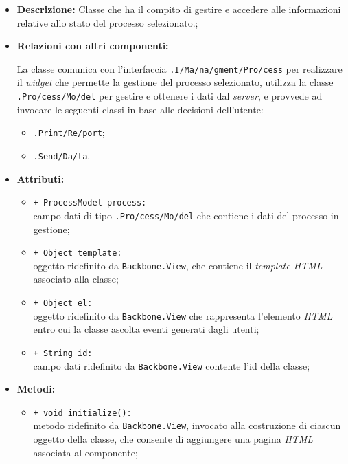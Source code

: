 \begin{flushleft}
\begin{itemize}
\item \textbf{Descrizione:} Classe che ha il compito di gestire e accedere alle informazioni relative allo stato del processo selezionato.;
\item \textbf{Relazioni con altri componenti:}
\begin{sloppypar}
La classe comunica con l'interfaccia \texttt{\viewUser{}.I\fshyp{}Ma\fshyp{}na\fshyp{}gment\fshyp{}Pro\fshyp{}cess} per realizzare il \textit{widget} che permette la gestione del processo selezionato, utilizza la classe \texttt{\model{}.Pro\fshyp{}cess\fshyp{}Mo\fshyp{}del} per gestire e ottenere i dati dal \textit{server}, e provvede ad invocare le seguenti classi in base alle decisioni dell'utente:
\begin{itemize}
\item \texttt{\logicUser{}.Print\fshyp{}Re\fshyp{}port};
\item \texttt{\logicUser{}.Send\fshyp{}Da\fshyp{}ta}.
\end{itemize}
\end{sloppypar}
\item \textbf{Attributi:}
\begin{sloppypar}
\begin{itemize}
\item \texttt{+ ProcessModel process:}\\ campo dati di tipo \texttt{\model{}.Pro\fshyp{}cess\fshyp{}Mo\fshyp{}del} che contiene i dati del processo in gestione;
\item \texttt{+ Object template:}\\ oggetto ridefinito da \texttt{Backbone.View}, che contiene il \textit{template HTML} associato alla classe;
\item \texttt{+ Object el:}\\ oggetto ridefinito da \texttt{Backbone.View} che rappresenta l'elemento \textit{HTML} entro cui la classe ascolta eventi generati dagli utenti;
\item \texttt{+ String id:}\\ campo dati ridefinito da \texttt{Backbone.View} contente l'id della classe;
\end{itemize}
\end{sloppypar}
\item \textbf{Metodi:}
\begin{sloppypar}
\begin{itemize}
\item \texttt{+ void initialize():}\\ metodo ridefinito da \texttt{Backbone.View}, invocato alla costruzione di ciascun oggetto della classe, che consente di aggiungere una pagina \textit{HTML} associata al componente;

\end{itemize}
\end{sloppypar}
\end{itemize}
\end{flushleft}
